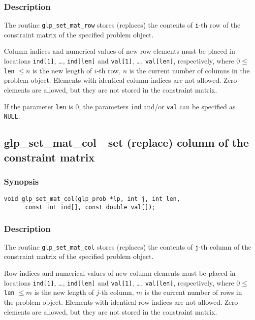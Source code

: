 \subsubsection*{Description}

The routine \verb|glp_set_mat_row| stores (replaces) the contents of
\verb|i|-th row of the constraint matrix of the specified problem
object.

Column indices and numerical values of new row elements must be placed
in locations \verb|ind[1]|, \dots, \verb|ind[len]| and \verb|val[1]|,
\dots, \verb|val[len]|, respectively, where $0 \leq$ \verb|len| $\leq n$
is the new length of $i$-th row, $n$ is the current number of columns in
the problem object. Elements with identical column indices are not
allowed. Zero elements are allowed, but they are not stored in the
constraint matrix.

If the parameter \verb|len| is 0, the parameters \verb|ind| and/or
\verb|val| can be specified as \verb|NULL|.

\subsection{glp\_set\_mat\_col---set (replace) column of the
constr\-aint matrix}

\subsubsection*{Synopsis}

\begin{verbatim}
void glp_set_mat_col(glp_prob *lp, int j, int len,
      const int ind[], const double val[]);
\end{verbatim}

\subsubsection*{Description}

The routine \verb|glp_set_mat_col| stores (replaces) the contents of
\verb|j|-th column of the constraint matrix of the specified problem
object.

Row indices and numerical values of new column elements must be placed
in locations \verb|ind[1]|, \dots, \verb|ind[len]| and \verb|val[1]|,
\dots, \verb|val[len]|, respectively, where $0 \leq$ \verb|len| $\leq m$
is the new length of $j$-th column, $m$ is the current number of rows in
the problem object. Elements with identical row indices are not allowed.
Zero elements are allowed, but they are not stored in the constraint
matrix.

